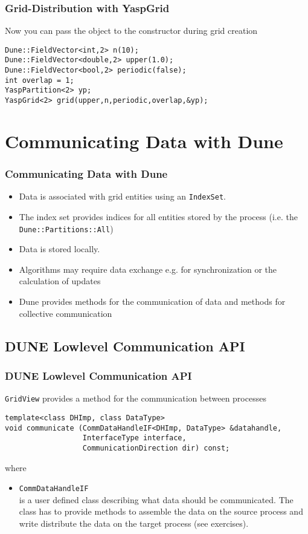 \begin{frame}[fragile]
  \frametitle<presentation>{Grid-Distribution with YaspGrid}
Now you can pass the object to the constructor during grid creation
\begin{lstlisting}[breaklines=true]
Dune::FieldVector<int,2> n(10);
Dune::FieldVector<double,2> upper(1.0);
Dune::FieldVector<bool,2> periodic(false);
int overlap = 1;
YaspPartition<2> yp;
YaspGrid<2> grid(upper,n,periodic,overlap,&yp);
\end{lstlisting}
\end{frame}

\section{Communicating Data with Dune}
\begin{frame}[fragile]
  \frametitle<presentation>{Communicating Data with Dune}


  \begin{itemize}
  \item Data is associated with grid entities using an \texttt{IndexSet}.
  \item The index set provides indices for all entities stored by the process (i.e. the \lstinline!Dune::Partitions::All!)
  \item Data is stored locally.
  \item Algorithms may require data exchange e.g. for synchronization or the calculation of updates
  \item Dune provides methods for the communication of data and methods for collective communication
  \end{itemize}

\end{frame}


\subsection{DUNE Lowlevel Communication API}
\begin{frame}[fragile]
  \frametitle<presentation>{DUNE Lowlevel Communication API}

  \texttt{GridView} provides a method for the communication between processes
    \begin{lstlisting}
template<class DHImp, class DataType>
void communicate (CommDataHandleIF<DHImp, DataType> &datahandle,
                  InterfaceType interface,
                  CommunicationDirection dir) const;
    \end{lstlisting}
where
    \begin{itemize}
    \item \lstinline!CommDataHandleIF!\\
      is a user defined class describing what data should be communicated. The class has to provide methods to assemble the data on the
      source process and write distribute the data on the target process (see exercises).
    \end{itemize}
\end{frame}


